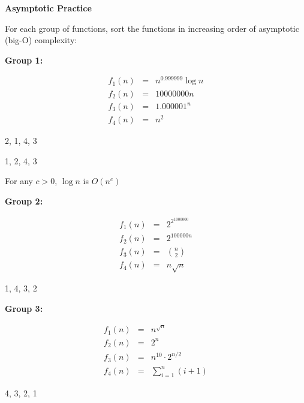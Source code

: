 \documentclass[12pt,twoside]{article}
\begin{document}
\begin{problems}

\problem {} \textbf{Asymptotic Practice}

For each group of functions, sort the functions in increasing order of
asymptotic (big-O) complexity:

\begin{problemparts}

\problempart {} \textbf{Group 1:}

$$
\begin{array}{rcl}
f_1(n) &=& n^{0.999999} \log n \\
f_2(n) &=& 10000000 n \\
f_3(n) &=& 1.000001^n \\
f_4(n) &=& n^2
\end{array}
$$

\ifsolution \solution{}
2, 1, 4, 3
\fi

\ifsolution \correctsolution{}
1, 2, 4, 3
\fi

\ifsolution \reason{}
For any $c > 0$, $\log n $ is $O(n^c)$
\fi

\problempart {} \textbf{Group 2:}

$$
\begin{array}{rcl}
f_1(n) &=& 2^{2^{1000000}} \\
f_2(n) &=& 2^{100000n} \\
f_3(n) &=& \displaystyle \binom{n}{2} \\
f_4(n) &=& n \sqrt{n}
\end{array}
$$

\ifsolution \solution{}
1, 4, 3, 2
\fi

\problempart {} \textbf{Group 3:}

$$
\begin{array}{rcl}
f_1(n) &=& n^{\sqrt{n}} \\
f_2(n) &=& 2^n \\
f_3(n) &=& n^{10} \cdot 2^{n / 2} \\
f_4(n) &=& \displaystyle\sum_{i = 1}^{n} (i + 1)
\end{array}
$$

\ifsolution \solution{}
4, 3, 2, 1
\fi


\end{problemparts}
\end{problems}
\end{document}
